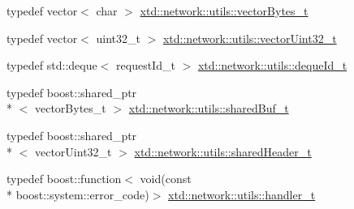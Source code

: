 \begin{DoxyCompactItemize}
typedef vector$<$ char $>$ \hyperlink{namespacextd_1_1network_1_1utils_a9fedf0d18549b8034e9ae347955e9a9a}{xtd\-::network\-::utils\-::vector\-Bytes\-\_\-t}
\item 
typedef vector$<$ uint32\-\_\-t $>$ \hyperlink{namespacextd_1_1network_1_1utils_a2b135df55039cd8024b40ef3e1817681}{xtd\-::network\-::utils\-::vector\-Uint32\-\_\-t}
\item 
typedef std\-::deque$<$ request\-Id\-\_\-t $>$ \hyperlink{namespacextd_1_1network_1_1utils_ac3ca189267ad1167fa141608f8b3a2de}{xtd\-::network\-::utils\-::deque\-Id\-\_\-t}
\item 
typedef boost\-::shared\-\_\-ptr\\*
$<$ vector\-Bytes\-\_\-t $>$ \hyperlink{namespacextd_1_1network_1_1utils_a92b366b7e2a1ab09ac4f4a0401f8fb84}{xtd\-::network\-::utils\-::shared\-Buf\-\_\-t}
\item 
typedef boost\-::shared\-\_\-ptr\\*
$<$ vector\-Uint32\-\_\-t $>$ \hyperlink{namespacextd_1_1network_1_1utils_af5b287652a0fd8fca54642f8d3ca07fa}{xtd\-::network\-::utils\-::shared\-Header\-\_\-t}
\item 
typedef boost\-::function$<$ void(const \\*
boost\-::system\-::error\-\_\-code)$>$ \hyperlink{namespacextd_1_1network_1_1utils_ac8a6f796cd645f83cde023d163665bb5}{xtd\-::network\-::utils\-::handler\-\_\-t}
\end{DoxyCompactItemize}
